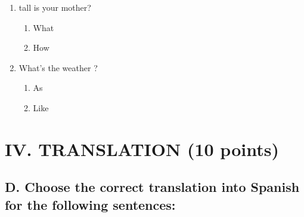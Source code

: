 \documentclass[11pt,a4paper]{article}
\begin{document}
\begin{enumerate}
    \item \underline{\hspace{2cm}} tall is your mother?
    \begin{enumerate}[label=\alph*.] \item What \item How \end{enumerate}

    \item What's the weather \underline{\hspace{2cm}}?
    \begin{enumerate}[label=\alph*.] \item As \item Like \end{enumerate}
\end{enumerate}

\section{IV. TRANSLATION (10 points)}

\subsection{D. Choose the correct translation into Spanish for the following sentences:}
\end{document}
